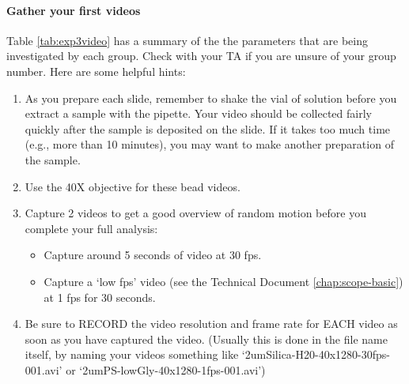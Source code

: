 \paragraph*{Gather your first videos} 
Table \ref{tab:exp3video} has a summary of the the parameters that are being investigated by each group.
Check with your TA if you are unsure of your group number.
Here are some helpful hints:
\begin{enumerate}
\item As you prepare each slide, remember to shake the vial of solution before you extract a sample with the pipette. Your video should be collected fairly quickly after the sample is deposited on the slide. If it takes too much time (e.g., more than 10 minutes), you may want to make another preparation of the sample.
\item Use the 40X objective for these bead videos.
\item Capture 2 videos to get a good overview of random motion before you complete your full analysis:
\begin{itemize}
	\item Capture around 5 seconds of video at 30 fps.
	\item Capture a `low fps' video (see the Technical Document \ref{chap:scope-basic}) at 1 fps for 30 seconds. 
\end{itemize}
\item Be sure to RECORD the video resolution and frame rate for EACH video as soon as you have captured the video. (Usually this is done in the file name itself, by naming your videos something like `2umSilica-H20-40x1280-30fps-001.avi' or `2umPS-lowGly-40x1280-1fps-001.avi')
\end{enumerate}
